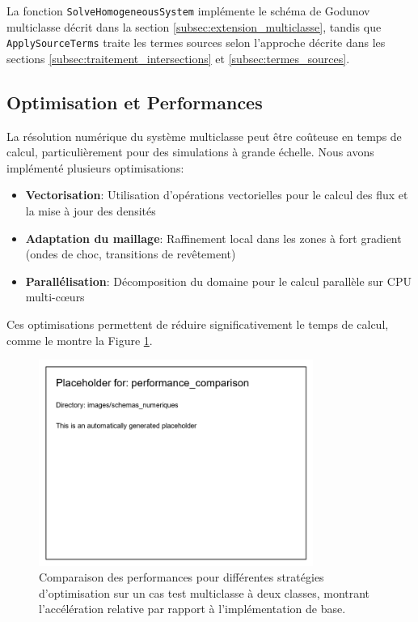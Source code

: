 La fonction \texttt{SolveHomogeneousSystem} implémente le schéma de Godunov multiclasse décrit dans la section \ref{subsec:extension_multiclasse}, tandis que \texttt{ApplySourceTerms} traite les termes sources selon l'approche décrite dans les sections \ref{subsec:traitement_intersections} et \ref{subsec:termes_sources}.

\subsection{Optimisation et Performances}
\label{subsec:optimisation}

La résolution numérique du système multiclasse peut être coûteuse en temps de calcul, particulièrement pour des simulations à grande échelle. Nous avons implémenté plusieurs optimisations:

\begin{itemize}
\item \textbf{Vectorisation}: Utilisation d'opérations vectorielles pour le calcul des flux et la mise à jour des densités
\item \textbf{Adaptation du maillage}: Raffinement local dans les zones à fort gradient (ondes de choc, transitions de revêtement)
\item \textbf{Parallélisation}: Décomposition du domaine pour le calcul parallèle sur CPU multi-cœurs
\end{itemize}

Ces optimisations permettent de réduire significativement le temps de calcul, comme le montre la Figure \ref{fig:performance}.

\begin{figure}[htbp]
\centering
\includegraphics[width=0.8\textwidth]{images/schemas_numeriques/performance_comparison}
\caption{Comparaison des performances pour différentes stratégies d'optimisation sur un cas test multiclasse à deux classes, montrant l'accélération relative par rapport à l'implémentation de base.}
\label{fig:performance}
\end{figure}

